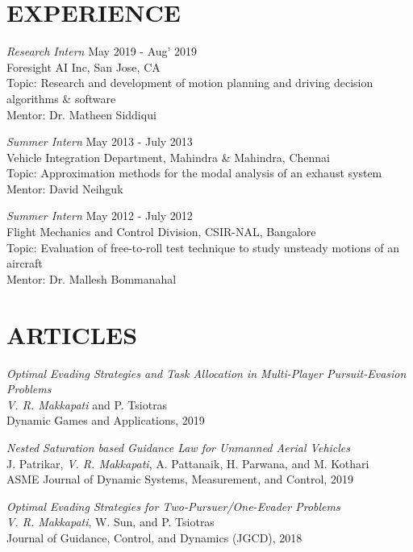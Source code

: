 \documentclass[margin, 10pt]{res} %
\begin{document}
\begin{resume}
\section{EXPERIENCE}

{\sl Research Intern} \hfill May 2019 - Aug' 2019\\
Foresight AI Inc, San Jose, CA \\
Topic: Research and development of motion planning and driving decision algorithms \& software\\
Mentor: Dr. Matheen Siddiqui

{\sl Summer Intern} \hfill May 2013 - July 2013 \\
Vehicle Integration Department, Mahindra \& Mahindra, Chennai \\
Topic: Approximation methods for the modal analysis of an exhaust system\\
Mentor: David Neihguk

{\sl Summer Intern} \hfill May 2012 - July 2012 \\
Flight Mechanics and Control Division, CSIR-NAL, Bangalore \\
Topic: Evaluation of free-to-roll test technique to study unsteady motions of an aircraft \\
Mentor: Dr. Mallesh Bommanahal


\section{ARTICLES} 
{\sl Optimal Evading Strategies and Task Allocation in Multi-Player Pursuit-Evasion Problems} \\
\textit{V. R. Makkapati} and P. Tsiotras \\
Dynamic Games and Applications, 2019

{\sl Nested Saturation based Guidance Law for Unmanned Aerial Vehicles} \\
J. Patrikar, \textit{V. R. Makkapati}, A. Pattanaik, H. Parwana, and M. Kothari \\
ASME Journal of Dynamic Systems, Measurement, and Control, 2019

{\sl Optimal Evading Strategies for Two-Pursuer/One-Evader Problems} \\
\textit{V. R. Makkapati}, W. Sun, and P. Tsiotras \\
Journal of Guidance, Control, and Dynamics (JGCD), 2018


\end{resume}
\end{document}
